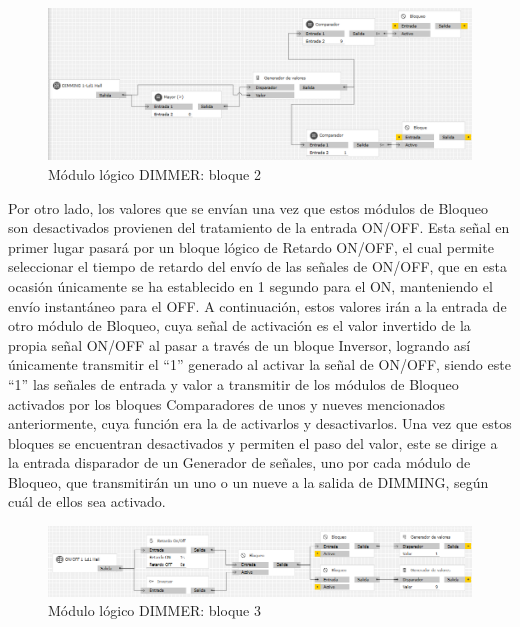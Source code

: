  \begin{center}
\begin{figure}[H]
\includegraphics[width=1\textwidth]{figures/log_dimm_b2.png}   
\caption{Módulo lógico DIMMER: bloque 2}
\label{fig:log_dimm_b2}
\end{figure}
\end{center}
Por otro lado, los valores que se envían una vez que estos módulos de Bloqueo son desactivados provienen del tratamiento de la entrada ON/OFF. Esta señal en primer lugar pasará por un bloque lógico de Retardo ON/OFF, el cual permite seleccionar el tiempo de retardo del envío de las señales de ON/OFF, que en esta ocasión únicamente se ha establecido en 1 segundo para el ON, manteniendo el envío instantáneo para el OFF. A continuación, estos valores irán a la entrada de otro módulo de Bloqueo, cuya señal de activación es el valor invertido de la propia señal ON/OFF al pasar a través de un bloque Inversor, logrando así únicamente transmitir el “1” generado al activar la señal de ON/OFF, siendo este “1” las señales de entrada y valor a transmitir de los módulos de Bloqueo activados por los bloques Comparadores de unos y nueves mencionados anteriormente, cuya función era la de activarlos y desactivarlos. Una vez que estos bloques se encuentran desactivados y permiten el paso del valor, este se dirige a la entrada disparador de un Generador de señales, uno por cada módulo de Bloqueo, que transmitirán un uno o un nueve a la salida de DIMMING, según cuál de ellos sea activado.
 \begin{center}
\begin{figure}[H]
\includegraphics[width=1\textwidth]{figures/log_dimm_b3.png}   
\caption{Módulo lógico DIMMER: bloque 3}
\label{fig:log_dimm_b3}
\end{figure}
\end{center}
